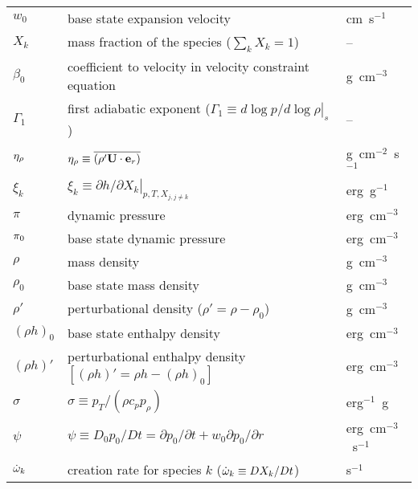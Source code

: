 \begin{center}
\begin{longtable}{|l|p{4.0in}|l|}
$w_0$   & base state expansion velocity              & cm~s$^{-1}$ \\
$X_k$   & mass fraction of the species ($\sum_k X_k = 1$) & -- \\
$\beta_0$ & coefficient to velocity
            in velocity constraint equation  & g~cm$^{-3}$ \\
$\Gamma_1$ & first adiabatic exponent ($\Gamma_1 \equiv \left . d \log p/d \log \rho \right |_s$) & -- \\
$\eta_{\rho}$ & $\eta_{\rho} \equiv \overline{(\rho' {\bf U} \cdot {\bf e}_r)}$ & g~cm$^{-2}$~s$^{-1}$ \\
$\xi_k$ & $\xi_k \equiv \left . \partial h / \partial X_k \right |_{p,T,X_{j,j\ne k}}$ & erg~g$^{-1}$ \\
$\pi$   & dynamic pressure & erg~cm$^{-3}$ \\
$\pi_0$ & base state dynamic pressure & erg~cm$^{-3}$ \\
$\rho$  & mass density  & g~cm$^{-3}$ \\
$\rho_0$  & base state mass density  & g~cm$^{-3}$ \\
$\rho'$  & perturbational density ($\rho' = \rho - \rho_0$) & g~cm$^{-3}$ \\
$(\rho h)_0$ & base state enthalpy density & erg~cm$^{-3}$  \\
$(\rho h)'$ & perturbational enthalpy density 
              $ \left [(\rho h)' = \rho h - (\rho h)_0 \right ]$ & erg~cm$^{-3}$  \\
$\sigma$ & $\sigma \equiv p_T/(\rho c_p p_\rho)$ & erg$^{-1}$~g \\
$\psi$  & $\psi \equiv D_0 p_0/Dt = \partial p_0/\partial t + w_0\partial p_0/\partial r$ & erg~cm$^{-3}$~s$^{-1}$ \\
$\dot{\omega}_k$ & creation rate for species $k$ ($\dot{\omega}_k \equiv DX_k/Dt$) & s$^{-1}$ \\
\end{longtable}
\end{center}

\renewcommand{\arraystretch}{1.0}

